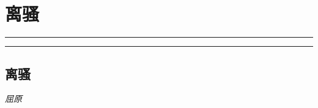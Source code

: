 \documentclass[]{article}
\date{}
\begin{document}
\hypertarget{header-n2761}{%
\section{离骚}\label{header-n2761}}

\begin{center}\rule{0.5\linewidth}{\linethickness}\end{center}

\tableofcontents

\begin{center}\rule{0.5\linewidth}{\linethickness}\end{center}

\hypertarget{header-n2767}{%
\subsection{离骚}\label{header-n2767}}

\emph{屈原}
\end{document}
